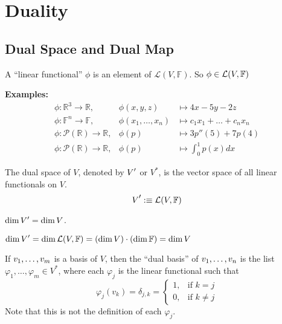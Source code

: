 
\section{Duality}
\subsection{Dual Space and Dual Map}

\setcounter{thm}{107}
\begin{mydef}
  A ``linear functional'' $\phi$ is an element of $\mathcal{L}(V, \mathbb{F})$. So $\phi \in \mathcal{L}(V, \mathbb{F})$
\end{mydef}

\textbf{Examples:}
\begin{equation}
  \begin{array}{lll}
    \phi: \mathbb{R}^3  \to \mathbb{R}, &\phi (x,y,z)  & \mapsto 4x-5y-2z \\
    \phi: \mathbb{F}^n  \to \mathbb{F}, &\phi (x_1, \dots, x_n)
    & \mapsto c_1x_1 + \dots + c_nx_n  \\
    \phi: \mathcal{P} (\mathbb{R})  \to \mathbb{R},
    & \phi(p) & \mapsto 3p''(5) + 7p(4) \\
    \phi: \mathcal{P}(\mathbb{R}) \to \mathbb{R},
    & \phi(p)  &\mapsto \textstyle \int_{0}^{1} p(x) dx
  \end{array}
\end{equation}

\setcounter{thm}{109}
\begin{thm}
  The dual space of $V$, denoted by $\dual{V}$ or $V^{*}$, is the vector space of all linear functionals on $V$.
  \begin{equation}
    \dual{V} :\equiv \linmap(V, \myF)
  \end{equation}
\end{thm}

\begin{thm}
  $\dim \dual{V} = \dim V$.
\end{thm}
\begin{prf}
  $\dim \dual{V} = \dim \mathcal{L}(V, \mathbb{F})=(\dim V) \cdot (\dim \mathbb{F}) = \dim V $
\end{prf}


\begin{mydef}
  If $v_1, \dots, v_m$ is a basis of $V$, then the ``dual basis'' of $v_1, \dots, v_n$ is the list $\varphi_1, \dots, \varphi_m \in V^{*}$, where each $\varphi_j$ is the linear functional such that
  \begin{equation}
    \varphi_j(v_k) = \delta_{j,k} =
  \begin{cases}
    1,  & \text{if $k=j$} \\
    0, & \text{if $k \neq j$}
  \end{cases}
  \end{equation}
  Note that this is not the definition of each $\varphi_j$.
\end{mydef}

